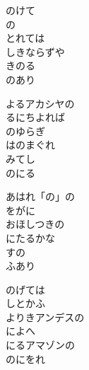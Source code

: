 \documentclass[10pt,b5j]{tarticle} %
\begin{document}
\vspace{1.5em} %
\newcommand{\linespace}{0.5em} %
\newcommand{\blocksize}{0.5\hsize} %
\begin{enumerate} %
    \begin{minipage}[c]{\blocksize}
    
        \vspace{\linespace}
        \item
        のけて\\
        の\\
        とれては\\
        しきならずや\\
        きのる\\
        のあり
        
        \vspace{\linespace}
        \item
        よるアカシヤの\\
        るにちよれば\\
        のゆらぎ\\
        はのまぐれ\\
        みてし\\
        のにる
        
        \vspace{\linespace}
        \item
        あはれ「の」の\\
        をがに\\
        おほしつきの\\
        にたるかな\\
        すの\\
        ふあり
        
        \vspace{\linespace}
        \item
        のげては\\
        しとかふ\\
        よりきアンデスの\\
        によへ\\
        にるアマゾンの\\
        のにをれ
        

\end{minipage}
\end{enumerate}
\end{document}
